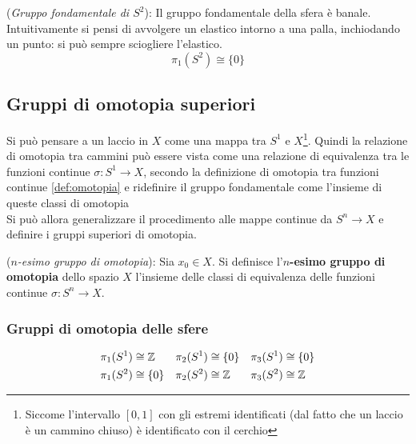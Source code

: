 \begin{example}
   (\emph{Gruppo fondamentale di $S^2$}): Il gruppo fondamentale della sfera è banale.
   Intuitivamente si pensi di avvolgere un elastico intorno a una palla, inchiodando
   un punto: si può sempre sciogliere l'elastico.
   $$
      \pi_1 (S^2) \cong \{ 0\}
   $$
\end{example}
\subsection{Gruppi di omotopia superiori}
Si può pensare a un laccio in $X$ come una mappa tra $S^1$ e $X$\footnote{
Siccome l'intervallo $[0,1]$ con gli estremi identificati
(dal fatto che un laccio è un cammino chiuso) è identificato con il cerchio}.
Quindi la relazione di omotopia tra cammini può essere vista come una relazione
di equivalenza tra le funzioni continue $\sigma : S^1 \to X$, secondo la definizione
di omotopia tra funzioni continue \ref{def:omotopia} e ridefinire
il gruppo fondamentale come l'insieme di queste classi di omotopia\\

Si può allora generalizzare il procedimento alle mappe continue da $S^n \to X$ e
definire i gruppi superiori di omotopia.

\begin{definition}(\emph{$n$-esimo gruppo di omotopia}):
   Sia $x_0 \in X$. Si definisce l'\textbf{$n$-esimo gruppo di omotopia}
   dello spazio $X$ l'insieme delle classi di equivalenza delle funzioni continue
   $\sigma : S^n \to X$.
\end{definition}

\subsubsection{Gruppi di omotopia delle sfere}
\begin{equation}
   \begin{aligned}
      \pi_1(S^1) & \cong \mathbb{Z}  &
      \pi_2(S^1) & \cong \{ 0 \}   &
      \pi_3(S^1) & \cong \{ 0 \}   \\
      \pi_1(S^2) & \cong \{ 0 \}   &
      \pi_2(S^2) & \cong \mathbb{Z}  &
      \pi_3(S^2) & \cong \mathbb{Z}
   \end{aligned}
\end{equation}
